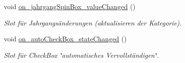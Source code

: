 \begin{CompactItemize}
void \hyperlink{class_r_f_i_d_input_dialog_814026b0c5b8a24cb6a97e1eefd0284a}{on\_\-jahrgangSpinBox\_\-valueChanged} ()
\begin{CompactList}\small\item\em Slot für Jahrgangsänderungen (aktualisieren der Kategorie). \item\end{CompactList}\item 
void \hyperlink{class_r_f_i_d_input_dialog_46a201754a6bffc77cb0bdcd3f696a48}{on\_\-autoCheckBox\_\-stateChanged} ()
\begin{CompactList}\small\item\em Slot für CheckBox \char`\"{}automatisches Vervollständigen\char`\"{}. \item\end{CompactList}\end{CompactItemize}
